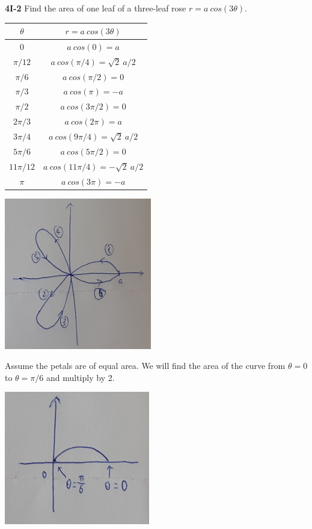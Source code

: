 \documentclass[9pt]{article}
\begin{document}
\begin{tcolorbox}
  \textbf{4I-2} Find the area of one leaf of a three-leaf rose $r = a\ cos(3 \theta)$.
\end{tcolorbox}

\begin{center}
  \begin{tabular}{|c|c|}
    \hline
    \rowcolor{Gray}
    $\theta$ & $r = a\ cos(3 \theta)$ \\ \hline
    $0$ & $a\ cos(0) = a$ \\ \hline
    $\pi / 12$ & $a\ cos(\pi / 4) = \sqrt{2} \ a / 2$ \\ \hline
    $\pi / 6$ & $a\ cos(\pi / 2) = 0$ \\ \hline
    $\pi / 3$ & $a\ cos(\pi) = -a$ \\ \hline
    $\pi / 2$ & $a\ cos(3 \pi / 2) = 0$ \\ \hline
    $2 \pi / 3$ & $a\ cos(2 \pi) = a$ \\ \hline
    $3 \pi / 4$ & $a\ cos(9 \pi / 4) = \sqrt{2} \ a / 2$ \\ \hline
    $5 \pi / 6$ & $a\ cos(5 \pi / 2) = 0$ \\ \hline
    $11 \pi / 12$ & $a\ cos(11 \pi / 4) = -\sqrt{2} \ a / 2$ \\ \hline
    $\pi$ & $a\ cos(3 \pi) = -a$ \\ \hline
  \end{tabular}
\end{center}

\begin{center}
  \includegraphics[scale=0.8]{p1_4i2.jpg}
\end{center}

Assume the petals are of equal area. We will find the area of the curve from $\theta = 0$ to $\theta = \pi / 6$ and multiply by 2.

\begin{center}
  \includegraphics[scale=0.8]{p1_4i2-integration.jpg}
\end{center}
\end{document}
